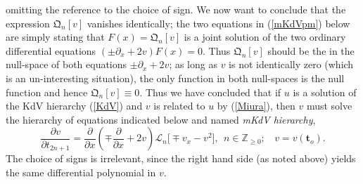 \documentclass[10pt,reqno,oneside]{amsart}
\numberwithin{equation}{section}
\newtheorem{theo}{Theorem}[section]
\def\le{\left}
\def\ri{\right}
\def\bt{\begin{theo}}
\def \pa{\partial}
\def\L{\mathcal L}
\def\eqref#1{(\ref{#1})}
\def\bt{{\mathbf t}}
\begin{document}
omitting the reference to the choice of sign. We now want to conclude that the expression $\mathfrak Q_{n}[v]$ vanishes identically;  the two equations in \eqref{mKdVpm} below are simply stating that $F(x)= \mathfrak Q_{n}[v]$ is a  joint solution of the two ordinary differential equations $(\pm \pa_x + 2v)F(x)=0$. Thus $\mathfrak Q_{n}[v]$ should be the in the null-space of both equations $\pm \pa_x + 2v$; as long as $v$ is not identically zero (which is an un-interesting situation), the only function in both null-spaces is the null function and hence $\mathfrak Q_{n}[v]\equiv 0$. Thus we have concluded that if $u$ is a  solution of the KdV hierarchy \eqref{KdV} and $v$ is related to $u$ by \eqref{Miura}, then $v$ must solve the hierarchy of equations indicated below and named  {\em mKdV hierarchy},
\begin{equation}\label{mKdVpm}
 	\frac{\pa v}{\pa t_{2n+1}} = \frac \pa{\pa x}\le( \mp \frac \pa{\pa x}   +  2v\ri) \L_n\big[ \mp v_x-v^2\big],\ \ n\in\mathbb{Z}_{\geq 0};\ \ \ \ v=v(\bt_o).
\end{equation}
The choice of signs is irrelevant, since the right hand side (as noted above) yields the same differential polynomial in $v$.
\end{document}
